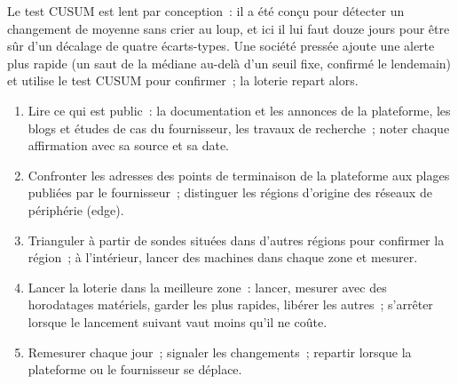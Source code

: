 \begin{omfigure}

\label{fig:nw:where-the-crypto-venues-live:drift}
\end{omfigure}

Le test CUSUM est lent par conception~: il a été conçu pour détecter un changement de moyenne sans crier au loup, et ici il lui faut douze jours pour être sûr
d'un décalage de quatre écarts-types. Une société pressée ajoute une alerte plus rapide (un saut de la médiane au-delà d'un seuil fixe, confirmé le lendemain)
et utilise le test CUSUM pour confirmer~; la loterie repart alors.

\begin{method}\label{met:nw:where-the-crypto-venues-live:find}
\begin{enumerate}
\item Lire ce qui est public~: la documentation et les annonces de la plateforme, les blogs et études de cas du fournisseur, les travaux de recherche~; noter chaque affirmation avec sa
  source et sa date.
\item Confronter les adresses des points de terminaison de la plateforme aux plages publiées par le fournisseur~; distinguer les régions d'origine des réseaux de périphérie (edge).
\item Trianguler à partir de sondes situées dans d'autres régions pour confirmer la région~; à l'intérieur, lancer des machines dans chaque zone et mesurer.
\item Lancer la loterie dans la meilleure zone~: lancer, mesurer avec des horodatages matériels, garder les plus rapides, libérer les autres~; s'arrêter lorsque le lancement suivant vaut
  moins qu'il ne coûte.
\item Remesurer chaque jour~; signaler les changements~; repartir lorsque la plateforme ou le fournisseur se déplace.
\end{enumerate}
\end{method}

